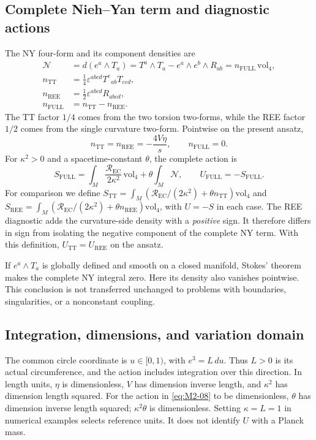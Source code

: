 \subsection{Complete Nieh--Yan term and diagnostic actions}
The NY four-form and its component densities are
\begin{equation}
\begin{aligned}
\mathcal N&=d(e^a\wedge T_a)
=T^a\wedge T_a-e^a\wedge e^b\wedge R_{ab}
=n_{\mathrm{FULL}}\,\mathrm{vol}_4,\\
n_{\mathrm{TT}}&=\frac14\varepsilon^{abcd}T^e{}_{ab}T_{ecd},\\
n_{\mathrm{REE}}&=\frac12\varepsilon^{abcd}R_{abcd},\\
n_{\mathrm{FULL}}&=n_{\mathrm{TT}}-n_{\mathrm{REE}}.
\end{aligned}
\tag{M2-06}\label{eq:M2-06}
\end{equation}
The TT factor $1/4$ comes from the two torsion two-forms, while the REE
factor $1/2$ comes from the single curvature two-form.
Pointwise on the present ansatz,
\begin{equation}
n_{\mathrm{TT}}=n_{\mathrm{REE}}=-\frac{4V\eta}{s},
\qquad n_{\mathrm{FULL}}=0.
\tag{M2-07}\label{eq:M2-07}
\end{equation}
For $\kappa^2>0$ and a spacetime-constant $\theta$, the complete action is
\begin{equation}
S_{\mathrm{FULL}}
=\int_M\frac{\mathcal R_{\mathrm{EC}}}{2\kappa^2}\,\mathrm{vol}_4
+\theta\int_M\mathcal N,\qquad U_{\mathrm{FULL}}=-S_{\mathrm{FULL}}.
\tag{M2-08}\label{eq:M2-08}
\end{equation}
For comparison we define
$S_{\mathrm{TT}}=\int_M(\mathcal R_{\mathrm{EC}}/(2\kappa^2)
+\theta n_{\mathrm{TT}})\mathrm{vol}_4$
and
$S_{\mathrm{REE}}=\int_M(\mathcal R_{\mathrm{EC}}/(2\kappa^2)
+\theta n_{\mathrm{REE}})\mathrm{vol}_4$, with $U=-S$ in each case.
The REE diagnostic adds the curvature-side density with a \emph{positive}
sign. It therefore differs in sign from isolating the negative component
of the complete NY term. With this definition,
$U_{\mathrm{TT}}=U_{\mathrm{REE}}$ on the ansatz.

If $e^a\wedge T_a$ is globally defined and smooth on a closed manifold,
Stokes' theorem makes the complete NY integral zero.
Here its density also vanishes pointwise. This conclusion is not transferred
unchanged to problems with boundaries, singularities, or a nonconstant coupling.

\subsection{Integration, dimensions, and variation domain}
The common circle coordinate is $u\in[0,1)$, with $e^3=L\,du$.
Thus $L>0$ is its actual circumference, and the action includes integration
over this direction. In length units, $\eta$ is dimensionless,
$V$ has dimension inverse length, and $\kappa^2$ has dimension length squared.
For the action in \eqref{eq:M2-08} to be dimensionless, $\theta$ has dimension
inverse length squared; $\kappa^2\theta$ is dimensionless.
Setting $\kappa=L=1$ in numerical examples selects reference units.
It does not identify $U$ with a Planck mass.

